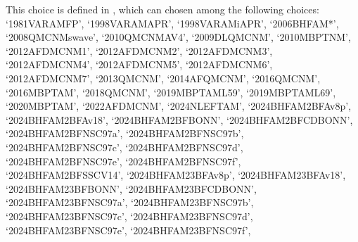 \documentclass[letterpaper,10pt,english]{sphinxmanual}
\begin{document}
\begin{fulllineitems}
\sphinxAtStartPar
This choice is defined in , which can chosen among     the following choices:     ‘1981\sphinxhyphen{}VAR\sphinxhyphen{}AM\sphinxhyphen{}FP’, ‘1998\sphinxhyphen{}VAR\sphinxhyphen{}AM\sphinxhyphen{}APR’, ‘1998\sphinxhyphen{}VAR\sphinxhyphen{}AM\sphinxhyphen{}iAPR’, ‘2006\sphinxhyphen{}BHF\sphinxhyphen{}AM*’,     ‘2008\sphinxhyphen{}QMC\sphinxhyphen{}NM\sphinxhyphen{}swave’, ‘2010\sphinxhyphen{}QMC\sphinxhyphen{}NM\sphinxhyphen{}AV4’, ‘2009\sphinxhyphen{}DLQMC\sphinxhyphen{}NM’, ‘2010\sphinxhyphen{}MBPT\sphinxhyphen{}NM’,     ‘2012\sphinxhyphen{}AFDMC\sphinxhyphen{}NM\sphinxhyphen{}1’, ‘2012\sphinxhyphen{}AFDMC\sphinxhyphen{}NM\sphinxhyphen{}2’, ‘2012\sphinxhyphen{}AFDMC\sphinxhyphen{}NM\sphinxhyphen{}3’, ‘2012\sphinxhyphen{}AFDMC\sphinxhyphen{}NM\sphinxhyphen{}4’,     ‘2012\sphinxhyphen{}AFDMC\sphinxhyphen{}NM\sphinxhyphen{}5’, ‘2012\sphinxhyphen{}AFDMC\sphinxhyphen{}NM\sphinxhyphen{}6’, ‘2012\sphinxhyphen{}AFDMC\sphinxhyphen{}NM\sphinxhyphen{}7’,     ‘2013\sphinxhyphen{}QMC\sphinxhyphen{}NM’, ‘2014\sphinxhyphen{}AFQMC\sphinxhyphen{}NM’, ‘2016\sphinxhyphen{}QMC\sphinxhyphen{}NM’, ‘2016\sphinxhyphen{}MBPT\sphinxhyphen{}AM’,     ‘2018\sphinxhyphen{}QMC\sphinxhyphen{}NM’, ‘2019\sphinxhyphen{}MBPT\sphinxhyphen{}AM\sphinxhyphen{}L59’, ‘2019\sphinxhyphen{}MBPT\sphinxhyphen{}AM\sphinxhyphen{}L69’,     ‘2020\sphinxhyphen{}MBPT\sphinxhyphen{}AM’, ‘2022\sphinxhyphen{}AFDMC\sphinxhyphen{}NM’, ‘2024\sphinxhyphen{}NLEFT\sphinxhyphen{}AM’,     ‘2024\sphinxhyphen{}BHF\sphinxhyphen{}AM\sphinxhyphen{}2BF\sphinxhyphen{}Av8p’, ‘2024\sphinxhyphen{}BHF\sphinxhyphen{}AM\sphinxhyphen{}2BF\sphinxhyphen{}Av18’, ‘2024\sphinxhyphen{}BHF\sphinxhyphen{}AM\sphinxhyphen{}2BF\sphinxhyphen{}BONN’, ‘2024\sphinxhyphen{}BHF\sphinxhyphen{}AM\sphinxhyphen{}2BF\sphinxhyphen{}CDBONN’,     ‘2024\sphinxhyphen{}BHF\sphinxhyphen{}AM\sphinxhyphen{}2BF\sphinxhyphen{}NSC97a’, ‘2024\sphinxhyphen{}BHF\sphinxhyphen{}AM\sphinxhyphen{}2BF\sphinxhyphen{}NSC97b’, ‘2024\sphinxhyphen{}BHF\sphinxhyphen{}AM\sphinxhyphen{}2BF\sphinxhyphen{}NSC97c’, ‘2024\sphinxhyphen{}BHF\sphinxhyphen{}AM\sphinxhyphen{}2BF\sphinxhyphen{}NSC97d’,     ‘2024\sphinxhyphen{}BHF\sphinxhyphen{}AM\sphinxhyphen{}2BF\sphinxhyphen{}NSC97e’, ‘2024\sphinxhyphen{}BHF\sphinxhyphen{}AM\sphinxhyphen{}2BF\sphinxhyphen{}NSC97f’, ‘2024\sphinxhyphen{}BHF\sphinxhyphen{}AM\sphinxhyphen{}2BF\sphinxhyphen{}SSCV14’,     ‘2024\sphinxhyphen{}BHF\sphinxhyphen{}AM\sphinxhyphen{}23BF\sphinxhyphen{}Av8p’, ‘2024\sphinxhyphen{}BHF\sphinxhyphen{}AM\sphinxhyphen{}23BF\sphinxhyphen{}Av18’, ‘2024\sphinxhyphen{}BHF\sphinxhyphen{}AM\sphinxhyphen{}23BF\sphinxhyphen{}BONN’, ‘2024\sphinxhyphen{}BHF\sphinxhyphen{}AM\sphinxhyphen{}23BF\sphinxhyphen{}CDBONN’,     ‘2024\sphinxhyphen{}BHF\sphinxhyphen{}AM\sphinxhyphen{}23BF\sphinxhyphen{}NSC97a’, ‘2024\sphinxhyphen{}BHF\sphinxhyphen{}AM\sphinxhyphen{}23BF\sphinxhyphen{}NSC97b’, ‘2024\sphinxhyphen{}BHF\sphinxhyphen{}AM\sphinxhyphen{}23BF\sphinxhyphen{}NSC97c’, ‘2024\sphinxhyphen{}BHF\sphinxhyphen{}AM\sphinxhyphen{}23BF\sphinxhyphen{}NSC97d’,     ‘2024\sphinxhyphen{}BHF\sphinxhyphen{}AM\sphinxhyphen{}23BF\sphinxhyphen{}NSC97e’, ‘2024\sphinxhyphen{}BHF\sphinxhyphen{}AM\sphinxhyphen{}23BF\sphinxhyphen{}NSC97f’, 
\end{fulllineitems}
\end{document}
